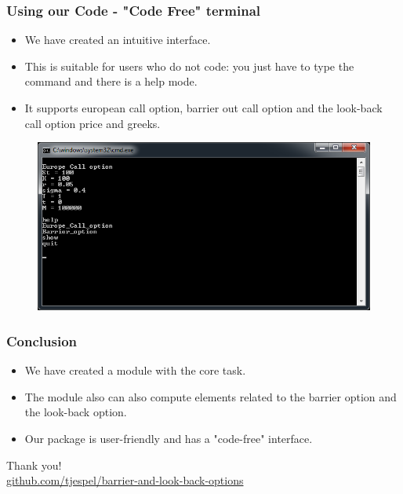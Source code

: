 \documentclass[12pt]{beamer}
\begin{document}
\begin{frame}
\frametitle{Using our Code - "Code Free" terminal}
\begin{itemize}
  \item We have created an intuitive interface.
  \item This is suitable for users who do not code: you just have to type the command and there is a help mode.
  \item It supports european call option, barrier out call option and the look-back call option price and greeks.
\end{itemize}
\begin{figure}[h!]
  \centering
\includegraphics[width=.8\textwidth]{graphs/interface_demo.png}
\end{figure}
\end{frame}



\begin{frame}
\frametitle{Conclusion}
\begin{itemize}
  \item We have created a module with the core task.
  \item The module also can also compute elements related to the barrier option and the look-back option.
  \item Our package is user-friendly and has a "code-free" interface.
\end{itemize}
\end{frame}



\begin{frame}

\centering
{\Large Thank you!}
\\[1cm]
{\small\url{github.com/tjespel/barrier-and-look-back-options}}
\end{frame}
\end{document}
